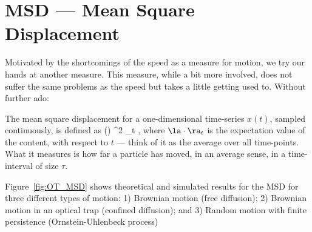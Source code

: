 \section{MSD --- Mean Square Displacement}
Motivated by the shortcomings of the speed as a measure for motion, we try our hands at another measure.
This measure, while a bit more involved, does not suffer the same problems as the speed but takes a little getting used to. Without further ado:

The mean square displacement for a one-dimensional time-series $x(t)$, sampled continuously, is defined as
\be
    \msd(\tau) \equiv \la {}^2 \ra_t \e,
\ee
where $\la \cdot \ra_t$ is the expectation value of the content, with respect to $t$ --- think of it as the average over all time-points.
What it measures is how far a particle has moved, in an average sense, in a time-interval of size $\tau$.

Figure~\ref{fig:OT_MSD} shows theoretical and simulated results for the MSD for three different types of motion:
1) Brownian motion (free diffusion); 2) Brownian motion in an optical trap (confined diffusion); and 3) Random motion with finite persistence (Ornstein-Uhlenbeck process)